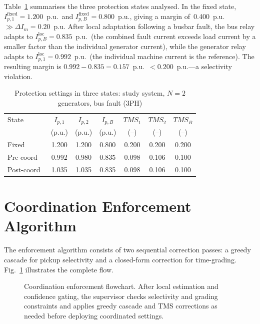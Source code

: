\documentclass[journal,twoside,letterpaper]{IEEEtran}
\begin{document}
Table~\ref{tab:states} summarises the three protection states
analysed.
In the fixed state, $I_{p,1}^{\mathrm{fixed}}=1.200$~p.u.\
and $I_{p,B}^{\mathrm{fixed}}=0.800$~p.u., giving a margin
of~0.400~p.u.\ $\gg \Delta I_m = 0.20$~p.u.
After local adaptation following a busbar fault, the bus relay
adapts to $I_{p,B}^{\mathrm{loc}}=0.835$~p.u.\ (the combined
fault current exceeds load current by a smaller factor than
the individual generator current), while the generator relay
adapts to $I_{p,1}^{\mathrm{loc}}=0.992$~p.u.\ (the individual
machine current is the reference).
The resulting margin is $0.992 - 0.835 = 0.157$~p.u.\
$< 0.200$~p.u.---a selectivity violation.

\begin{table}[!t]
\caption{Protection settings in three states: study system,
         $N=2$ generators, bus fault (3PH)}
\label{tab:states}
\centering
\renewcommand{\arraystretch}{1.15}
\begin{tabular}{lcccccc}
\toprule
State & $I_{p,1}$ & $I_{p,2}$ & $I_{p,B}$ &
        $TMS_1$ & $TMS_2$ & $TMS_B$ \\
      & (p.u.)    & (p.u.)    & (p.u.)    &
        (--) & (--) & (--) \\
\midrule
Fixed       & 1.200 & 1.200 & 0.800 & 0.200 & 0.200 & 0.200 \\
Pre-coord\  & 0.992 & 0.980 & 0.835 & 0.098 & 0.106 & 0.100 \\
Post-coord\ & 1.035 & 1.035 & 0.835 & 0.098 & 0.106 & 0.100 \\
\bottomrule
\end{tabular}
\end{table}

\section{Coordination Enforcement Algorithm}
\label{sec:algorithm}

The enforcement algorithm consists of two sequential
correction passes: a greedy cascade for pickup selectivity
and a closed-form correction for time-grading.
Fig.~\ref{fig:flowchart} illustrates the complete flow.

\begin{figure}[!t]
  \centering
  
  \caption{Coordination enforcement flowchart.
    After local estimation and confidence gating, the
    supervisor checks selectivity and grading constraints
    and applies greedy cascade and TMS corrections as
    needed before deploying coordinated settings.}
  \label{fig:flowchart}
\end{figure}
\end{document}
